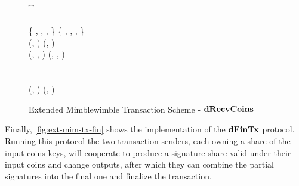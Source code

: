 \begin{landscape}
\begin{figure}
{{        \t \pcreturn \cnstFalsum \< \< \< \< \\
        \varProofBobCarol \opFunResult \procDRProofL{\funStarAlt{\varCoinShared}}{\varFundValue}{\varSecKeyBob} \< \< \< \< \varProofBobCarol \opFunResult \procDRProofL{\funStarAlt{\varCoinShared}}{\varFundValue}{\varSecKeyCarol} \\
        \funStar{\varPtSpendableCoinBob} \opAssign \{ \varCoinShared, \varFundValue, \funStar{\varBlindingFactorBob}, \varProofBobCarol \} \< \< \< \< \funStar{\varPtSpendableCoinCarol} \opAssign \{ \varCoinShared, \varFundValue, \funStar{\varBlindingFactorCarol}, \varProofBobCarol \} \\
        (\varSigBobCarol, \varPubKeyBobCarol) \opFunResult \procDSignL{\varMsg}{\varSecKeyBob}{\varNonceBob} \< \< \< \< (\varSigBobCarol, \varPubKeyBobCarol) \opFunResult \procDSignR{\varMsg}{\varSecKeyCarol}{\varNonceCarol} \\
        (\cdot, \cdot, \funStar{\varSigContext}) \opFunResult \varSigBobCarol \< \< \< \< (\cdot, \cdot, \funStar{\varSigContext}) \opFunResult \varSigBobCarol \\
        \funStarAlt{\varSigContext} \opFunResult {} \< \< \< \< \funStarAlt{\varSigContext} \opFunResult {} \\
        \< \funStar{\varPreTx} \opFunResult \procCreatePreTx{\varMsg}{\varInputs}{\varOutputs \opConc \funStarAlt{\varCoinShared}}{\varProofs \opConc \varProofBobCarol}{\funStarAlt{\varSigContext}}{\varCommits \opConc \varPubKeyBobCarol}{\varSigBobCarol}{\varTime} \< \\
        \pcreturn (\funStar{\varPreTx}, \funStar{\varPtSpendableCoinBob}) \< \< \< \< \pcreturn (\funStar{\varPreTx}, \funStar{\varPtSpendableCoinCarol})
        }
        }
        \caption{Extended Mimblewimble Transaction Scheme - $\mathbf{dRecvCoins}$ \label{fig:atom:drecv}}
    \end{figure}
\end{landscape}
\restoregeometry

Finally, \cref{fig:ext-mim-tx-fin} shows the implementation of the $\mathbf{dFinTx}$ protocol.
Running this protocol the two transaction senders, each owning a share of the input coins keys, will cooperate to produce a signature share valid under their input coins and change outputs, after which they can combine the partial signatures into the final one and finalize the transaction.

